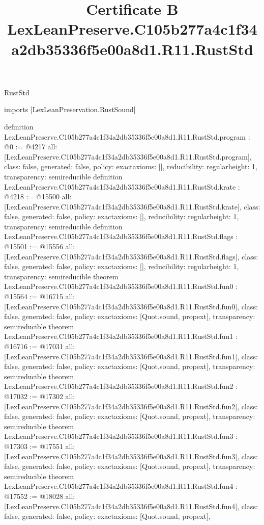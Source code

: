\begin{lexlean}{RustStd}
\title{Certificate B LexLeanPreserve.C105b277a4c1f34a2db35336f5e00a8d1.R11.RustStd}
\begin{coremodule}
imports [LexLeanPreservation.RustSound]

definition LexLeanPreserve.C105b277a4c1f34a2db35336f5e00a8d1.R11.RustStd.program : @0 := @4217 {
  all: [LexLeanPreserve.C105b277a4c1f34a2db35336f5e00a8d1.R11.RustStd.program],
  class: false,
  generated: false,
  policy: exact{axioms: []},
  reducibility: regular{height: 1},
  transparency: semireducible
}
definition LexLeanPreserve.C105b277a4c1f34a2db35336f5e00a8d1.R11.RustStd.krate : @4218 := @15500 {
  all: [LexLeanPreserve.C105b277a4c1f34a2db35336f5e00a8d1.R11.RustStd.krate],
  class: false,
  generated: false,
  policy: exact{axioms: []},
  reducibility: regular{height: 1},
  transparency: semireducible
}
definition LexLeanPreserve.C105b277a4c1f34a2db35336f5e00a8d1.R11.RustStd.flags : @15501 := @15556 {
  all: [LexLeanPreserve.C105b277a4c1f34a2db35336f5e00a8d1.R11.RustStd.flags],
  class: false,
  generated: false,
  policy: exact{axioms: []},
  reducibility: regular{height: 1},
  transparency: semireducible
}
theorem LexLeanPreserve.C105b277a4c1f34a2db35336f5e00a8d1.R11.RustStd.fun0 : @15564 := @16715 {
  all: [LexLeanPreserve.C105b277a4c1f34a2db35336f5e00a8d1.R11.RustStd.fun0],
  class: false,
  generated: false,
  policy: exact{axioms: [Quot.sound, propext]},
  transparency: semireducible
}
theorem LexLeanPreserve.C105b277a4c1f34a2db35336f5e00a8d1.R11.RustStd.fun1 : @16716 := @17031 {
  all: [LexLeanPreserve.C105b277a4c1f34a2db35336f5e00a8d1.R11.RustStd.fun1],
  class: false,
  generated: false,
  policy: exact{axioms: [Quot.sound, propext]},
  transparency: semireducible
}
theorem LexLeanPreserve.C105b277a4c1f34a2db35336f5e00a8d1.R11.RustStd.fun2 : @17032 := @17302 {
  all: [LexLeanPreserve.C105b277a4c1f34a2db35336f5e00a8d1.R11.RustStd.fun2],
  class: false,
  generated: false,
  policy: exact{axioms: [Quot.sound, propext]},
  transparency: semireducible
}
theorem LexLeanPreserve.C105b277a4c1f34a2db35336f5e00a8d1.R11.RustStd.fun3 : @17303 := @17551 {
  all: [LexLeanPreserve.C105b277a4c1f34a2db35336f5e00a8d1.R11.RustStd.fun3],
  class: false,
  generated: false,
  policy: exact{axioms: [Quot.sound, propext]},
  transparency: semireducible
}
theorem LexLeanPreserve.C105b277a4c1f34a2db35336f5e00a8d1.R11.RustStd.fun4 : @17552 := @18028 {
  all: [LexLeanPreserve.C105b277a4c1f34a2db35336f5e00a8d1.R11.RustStd.fun4],
  class: false,
  generated: false,
  policy: exact{axioms: [Quot.sound, propext]},
}
\end{coremodule}
\end{lexlean}
